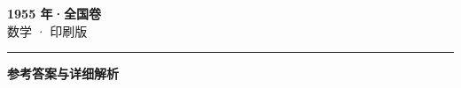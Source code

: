 \documentclass[zihao=5, a4paper]{ctexart}
\begin{document}
\begin{center}
  {\Large\bfseries 1955 年·全国卷}\\[4pt]
  {\large 数学 · 印刷版}
\end{center}
\medskip
{}

\par\bigskip\hrule\bigskip
{}
\begin{center}{\large\bfseries 参考答案与详细解析}\end{center}
\smallskip

\end{document}
